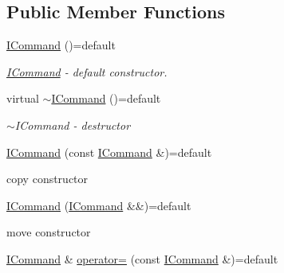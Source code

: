 \subsection*{Public Member Functions}
\begin{DoxyCompactItemize}
\item 
\hyperlink{classtwo__gis__test_1_1command__handler_1_1_i_command_ac6780eb9536e81697fdb4afa289f438a}{I\+Command} ()=default
\begin{DoxyCompactList}\small\item\em \hyperlink{classtwo__gis__test_1_1command__handler_1_1_i_command}{I\+Command} -\/ default constructor. \end{DoxyCompactList}\item 
virtual \hyperlink{classtwo__gis__test_1_1command__handler_1_1_i_command_a403d04e9061e1c708a7b726c2f7565dd}{$\sim$\+I\+Command} ()=default
\begin{DoxyCompactList}\small\item\em $\sim$\+I\+Command -\/ destructor \end{DoxyCompactList}\item 
\hyperlink{classtwo__gis__test_1_1command__handler_1_1_i_command_acf9cf2fcc9a9882db58d75607eb8259d}{I\+Command} (const \hyperlink{classtwo__gis__test_1_1command__handler_1_1_i_command}{I\+Command} \&)=default
\begin{DoxyCompactList}\small\item\em 
\begin{DoxyItemize}
\item copy constructor 
\end{DoxyItemize}\end{DoxyCompactList}\item 
\hyperlink{classtwo__gis__test_1_1command__handler_1_1_i_command_a07222bf1b8f0408d02abd263e6ea8b2d}{I\+Command} (\hyperlink{classtwo__gis__test_1_1command__handler_1_1_i_command}{I\+Command} \&\&)=default
\begin{DoxyCompactList}\small\item\em 
\begin{DoxyItemize}
\item move constructor 
\end{DoxyItemize}\end{DoxyCompactList}\item 
\hyperlink{classtwo__gis__test_1_1command__handler_1_1_i_command}{I\+Command} \& \hyperlink{classtwo__gis__test_1_1command__handler_1_1_i_command_aa617eba952feb604bea2a0defd9ec0c7}{operator=} (const \hyperlink{classtwo__gis__test_1_1command__handler_1_1_i_command}{I\+Command} \&)=default

\end{DoxyCompactItemize}
